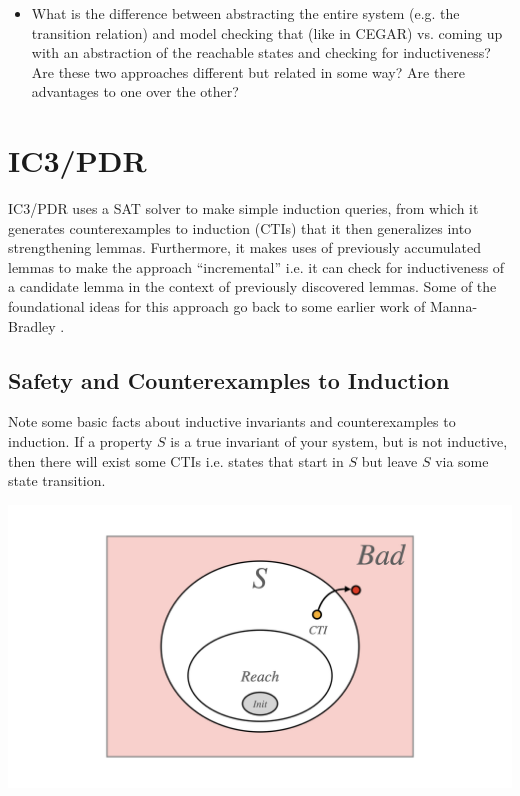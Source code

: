 \documentclass[10pt,a4paper]{article}
\begin{document}
\begin{itemize}
    \item What is the difference between abstracting the entire system (e.g. the transition relation) and model checking that (like in CEGAR) vs. coming up with an abstraction of the reachable states and checking for inductiveness? Are these two approaches different but related in some way? Are there advantages to one over the other?
\end{itemize}

\section{IC3/PDR}

IC3/PDR \cite{bradley2011sat} uses a SAT solver to make simple induction queries, from which it generates counterexamples to induction (CTIs) that it then generalizes into strengthening lemmas. Furthermore, it makes uses of previously accumulated lemmas to make the approach ``incremental'' i.e. it can check for inductiveness of a candidate lemma in the context of previously discovered lemmas. Some of the foundational ideas for this approach go back to some earlier work of Manna-Bradley \cite{2007bradleymannasafety}.

\subsection{Safety and Counterexamples to Induction}

Note some basic facts about inductive invariants and counterexamples to induction. If a property $S$ is a true invariant of your system, but is not inductive, then there will exist some CTIs i.e. states that start in $S$ but leave $S$ via some state transition.

\begin{center}
    \includegraphics[scale=0.15]{diagrams/inductive_inv1/inductive_inv1.001.png}
\end{center}
\end{document}

